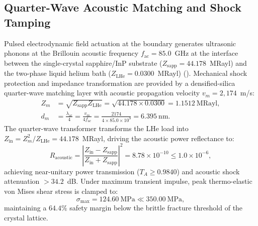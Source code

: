 \documentclass[11pt,onecolumn]{article}
\begin{document}
\subsection{Quarter-Wave Acoustic Matching and Shock Tamping}
\label{subsec:acoustic_tamping}
Pulsed electrodynamic field actuation at the boundary generates ultrasonic phonons at the Brillouin acoustic frequency $f_{\mathrm{ac}} = 85.0$~GHz at the interface between the single-crystal sapphire/InP substrate ($Z_{\mathrm{sapp}} = 44.178$~MRayl) and the two-phase liquid helium bath ($Z_{\mathrm{LHe}} = 0.0300$~MRayl) (). Mechanical shock protection and impedance transformation are provided by a densified-silica quarter-wave matching layer with acoustic propagation velocity $v_m = 2{,}174$~m/s:
\begin{align}
Z_m &= \sqrt{Z_{\mathrm{sapp}} Z_{\mathrm{LHe}}} = \sqrt{44.178 \times 0.0300} = 1.1512~\text{MRayl}, \label{eq:quarter_wave_zm} \\
d_m &= \frac{\lambda_{\mathrm{ac}}}{4} = \frac{v_m}{4 f_{\mathrm{ac}}} = \frac{2174}{4 \times 85.0 \times 10^9} = 6.395~\text{nm}. \label{eq:quarter_wave_dm}
\end{align}
The quarter-wave transformer transforms the LHe load into $Z_{\text{in}} = Z_m^2 / Z_{\mathrm{LHe}} = 44.178$~MRayl, driving the acoustic power reflectance to:
\begin{equation}
\label{eq:quarter_wave_reflectance}
R_{\mathrm{acoustic}} = \left|\frac{Z_{\text{in}} - Z_{\mathrm{sapp}}}{Z_{\text{in}} + Z_{\mathrm{sapp}}}\right|^2 = 8.78 \times 10^{-10} \le 1.0 \times 10^{-6},
\end{equation}
achieving near-unitary power transmission ($T_A \ge 0.9840$) and acoustic shock attenuation $>34.2$~dB. Under maximum transient impulse, peak thermo-elastic von Mises shear stress is clamped to:
\begin{equation}
\label{eq:quarter_wave_stress}
\sigma_{\max} = 124.60~\text{MPa} \ll 350.00~\text{MPa},
\end{equation}
maintaining a $64.4\%$ safety margin below the brittle fracture threshold of the crystal lattice.

\FloatBarrier
\end{document}
